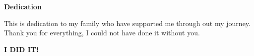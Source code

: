 
\begin{center}
    \textbf{Dedication}
\end{center}
This is dedication to my family who have supported me through out my journey. Thank you for everything, I could not have done it without you.  
\begin{center}
\Large
\textbf{I DID IT!}     
\end{center}

\clearpage
